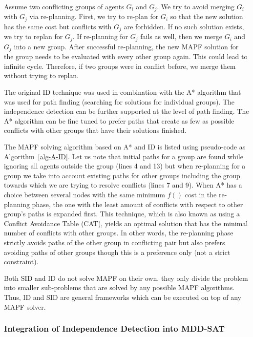 \documentclass[jair,oneside,11pt]{article}
\begin{document}
Assume two conflicting groups of agents $G_i$ and $G_j$. We try to avoid merging $G_i$ with $G_j$ via re-planning. First, we try to re-plan for $G_i$ so that the new solution has the same cost but conflicts with $G_j$ are forbidden. If no such solution exists, we try to replan for $G_j$. If re-planning for $G_j$ fails as well, then we merge $G_i$ and $G_j$ into a new group. After successful re-planning, the new MAPF solution for the group needs to be evaluated with every other group again. This could lead to infinite cycle. Therefore, if two groups were in conflict before, we merge them without trying to replan.

The original ID technique was used in combination with the A* algorithm that was used for path finding (searching for solutions for individual groups). The independence detection can be further supported at the level of path finding. The A* algorithm can be fine tuned to prefer paths that create as few as possible conflicts with other groups that have their solutions finished.

The MAPF solving algorithm based on A* and ID is listed using pseudo-code as Algorithm~\ref{alg-A-ID}. Let us note that initial paths for a group are found while ignoring all agents outside the group (lines 4 and 13) but when re-planning for a group we take into account existing paths for other groups including the group towards which we are trying to resolve conflicts (lines 7 and 9).  When A* has a choice between several nodes with the same minimum $f()$ cost in the re-planning phase, the one with the least amount of conflicts with respect to other group's paths is expanded first. This technique, which is also known as using a Conflict Avoidance Table (CAT), yields an optimal solution that has the minimal number of conflicts with other groups. In other words, the re-planning phase strictly avoids paths of the other group in conflicting pair but also prefers avoiding paths of other groups though this is a preference only (not a strict constraint).

Both SID and ID do not solve MAPF on their own, they only divide the problem into smaller sub-problems that are solved by any possible MAPF algorithms. Thus, ID and SID are general frameworks which can be executed on top of any MAPF solver.

\subsubsection{Integration of Independence Detection into MDD-SAT}
\end{document}
